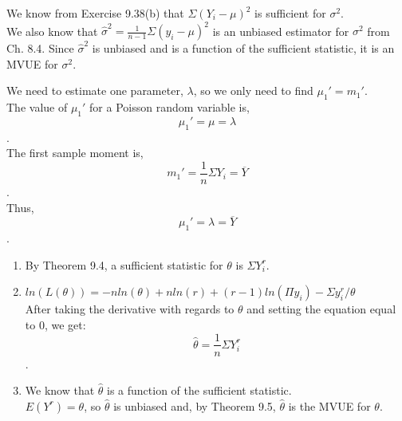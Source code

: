 \documentclass[12pt]{article}
\newenvironment{problem}[2][Problem]{\begin{trivlist}
\item[\hskip \labelsep {\bfseries #1}\hskip \labelsep {\bfseries #2.}]}{\end{trivlist}}
\begin{document}
\begin{problem}{9.56}
\end{problem}

We know from Exercise 9.38(b) that $\Sigma (Y_i - \mu)^2$ is sufficient for $\sigma^2$.\\

We also know that $\hat{\sigma}^2 = \frac{1}{n-1} \Sigma (y_i - \mu)^2$ is an unbiased estimator for $\sigma^2$ from Ch. 8.4. Since $\hat{\sigma}^2$ is unbiased and is a function of the sufficient statistic, it is an MVUE for $\sigma^2$.

\begin{problem}{9.70}
\end{problem}

We need to estimate one parameter, $\lambda$, so we only need to find $\mu_1' = m_1'$.\\

The value of $\mu_1'$ for a Poisson random variable is,
$$\mu_1' = \mu = \lambda$$.\\

The first sample moment is,
$$m_1' = \frac{1}{n} \Sigma Y_i = \overline{Y}$$.\\

Thus, 
$$\mu_1' = \lambda = \overline{Y}$$.

\begin{problem}{9.82}
\end{problem}

\begin{enumerate}[label=\alph*)]
	\item By Theorem 9.4, a sufficient statistic for $\theta$ is $\Sigma Y_i^r$.
	\item $ln(L(\theta)) = -nln(\theta) + nln(r) + (r-1)ln(\Pi y_i) - \Sigma y_i^r/\theta$\\
	After taking the derivative with regards to $\theta$ and setting the equation equal to 0, we get: $$\hat{\theta} = \frac{1}{n} \Sigma Y_i^r$$.
	\item We know that $\hat{\theta}$ is a function of the sufficient statistic.\\
	$E(Y^r) = \theta$, so $\hat{\theta}$ is unbiased and, by Theorem 9.5, $\hat{\theta}$ is the MVUE for $\theta$.
\end{enumerate}
\end{document}
